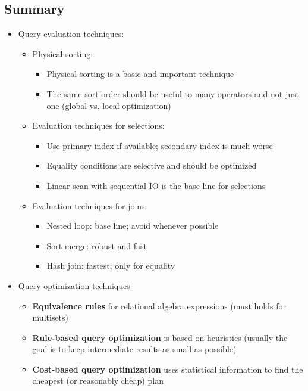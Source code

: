 \subsection{Summary}
\begin{itemize}[label=\(\rhd\)]
    \item Query evaluation techniques:
    \begin{itemize}[label=\(\rhd\)]
        \item Physical sorting:
        \begin{itemize}[label=\(\rhd\)]
            \item Physical sorting is a basic and important technique
            \item The same sort order should be useful to many operators and not just one (global vs, local optimization)
        \end{itemize}
        \item Evaluation techniques for selections:
        \begin{itemize}[label=\(\rhd\)]
            \item Use primary index if available; secondary index is much worse
            \item Equality conditions are selective and should be optimized 
            \item Linear scan with sequential IO is the base line for selections
        \end{itemize}
        \item Evaluation techniques for joins:
        \begin{itemize}[label=\(\rhd\)]
            \item Nested loop: base line; avoid whenever possible 
            \item Sort merge: robust and fast
            \item Hash join: fastest; only for equality
        \end{itemize}
    \end{itemize}
    \item Query optimization techniques
    \begin{itemize}[label=\(\rhd\)]
        \item \textbf{Equivalence rules} for relational algebra expressions (must holds for multisets)
        \item \textbf{Rule-based query optimization} is based on heuristics (usually the goal is to keep intermediate results as small as possible)
        \item \textbf{Cost-based query optimization} uses statistical information to find the cheapest (or reasonably cheap) plan
    \end{itemize}
\end{itemize}